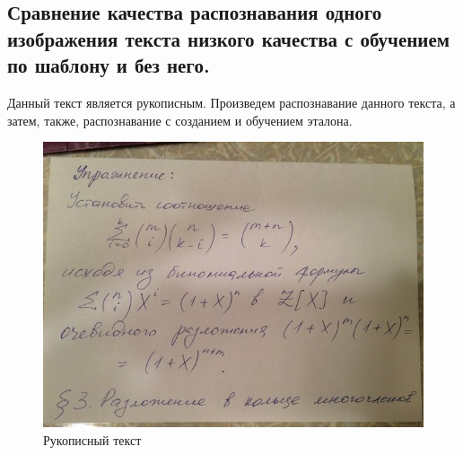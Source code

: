 		\subsection{Сравнение качества распознавания одного изображения текста низкого качества с обучением по шаблону и без него.}
		Данный текст является рукописным. Произведем распознавание данного текста, а затем, также, распознавание с созданием и обучением эталона.
		\begin{figure}[h]
			\centering
			\includegraphics[width=0.7\linewidth]{images/handwrite}
			\caption{Рукописный текст}
			\label{fig:handwrite}
		\end{figure}
				
